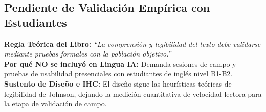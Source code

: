 \documentclass[10pt,a4paper]{article}
\begin{document}
\subsection*{Pendiente de Validación Empírica con Estudiantes}

\begin{tcolorbox}[excludedbox, title={C6.12 -- Probar la lectura con usuarios reales \hfill \colorbox{linguaRed}{\scriptsize\textbf{EXCLUIDO}}}]
\small
\textbf{Regla Teórica del Libro:} \textit{``La comprensión y legibilidad del texto debe validarse mediante pruebas formales con la población objetivo.''}\\
\textbf{Por qué NO se incluyó en Lingua IA:} Demanda sesiones de campo y pruebas de usabilidad presenciales con estudiantes de inglés nivel B1-B2.\\
\textbf{Sustento de Diseño e IHC:} El diseño sigue las heurísticas teóricas de legibilidad de Johnson, dejando la medición cuantitativa de velocidad lectora para la etapa de validación de campo.
\end{tcolorbox}
\end{document}
